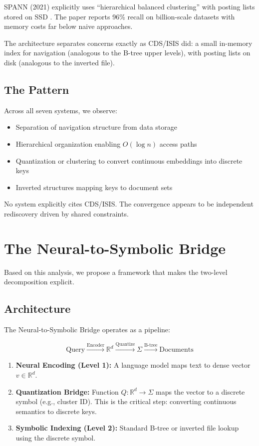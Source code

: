 \documentclass[manuscript,screen,nonacm]{acmart}
\begin{document}
SPANN (2021) explicitly uses ``hierarchical balanced clustering'' with posting lists stored on SSD \cite{chen2021}. The paper reports 96\% recall on billion-scale datasets with memory costs far below naive approaches.

The architecture separates concerns exactly as CDS/ISIS did: a small in-memory index for navigation (analogous to the B-tree upper levels), with posting lists on disk (analogous to the inverted file).

\subsection{The Pattern}

Across all seven systems, we observe:
\begin{itemize}
    \item Separation of navigation structure from data storage
    \item Hierarchical organization enabling $O(\log n)$ access paths
    \item Quantization or clustering to convert continuous embeddings into discrete keys
    \item Inverted structures mapping keys to document sets
\end{itemize}

No system explicitly cites CDS/ISIS. The convergence appears to be independent rediscovery driven by shared constraints.

\section{The Neural-to-Symbolic Bridge}

Based on this analysis, we propose a framework that makes the two-level decomposition explicit.

\subsection{Architecture}

The Neural-to-Symbolic Bridge operates as a pipeline:

\[ \text{Query} \xrightarrow{\text{Encoder}} \mathbb{R}^d \xrightarrow{\text{Quantize}} \Sigma \xrightarrow{\text{B-tree}} \text{Documents} \]

\begin{enumerate}
    \item \textbf{Neural Encoding (Level 1):} A language model maps text to dense vector $v \in \mathbb{R}^d$.
    \item \textbf{Quantization Bridge:} Function $Q: \mathbb{R}^d \rightarrow \Sigma$ maps the vector to a discrete symbol (e.g., cluster ID). This is the critical step: converting continuous semantics to discrete keys.
    \item \textbf{Symbolic Indexing (Level 2):} Standard B-tree or inverted file lookup using the discrete symbol.
\end{enumerate}
\end{document}
